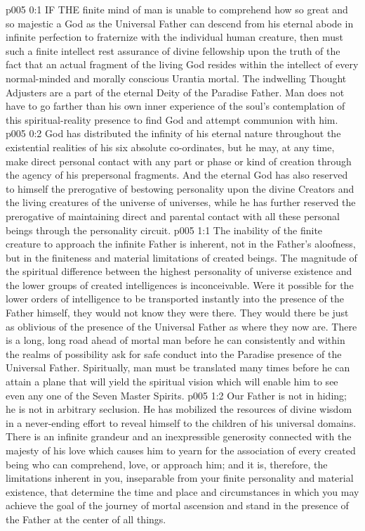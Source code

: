 \vs p005 0:1 IF THE finite mind of man is unable to comprehend how so great and so majestic a God as the Universal Father can descend from his eternal abode in infinite perfection to fraternize with the individual human creature, then must such a finite intellect rest assurance of divine fellowship upon the truth of the fact that an actual fragment of the living God resides within the intellect of every normal\hyp{}minded and morally conscious Urantia mortal. The indwelling Thought Adjusters are a part of the eternal Deity of the Paradise Father. Man does not have to go farther than his own inner experience of the soul’s contemplation of this spiritual\hyp{}reality presence to find God and attempt communion with him.
\vs p005 0:2 God has distributed the infinity of his eternal nature throughout the existential realities of his six absolute co\hyp{}ordinates, but he may, at any time, make direct personal contact with any part or phase or kind of creation through the agency of his prepersonal fragments. And the eternal God has also reserved to himself the prerogative of bestowing personality upon the divine Creators and the living creatures of the universe of universes, while he has further reserved the prerogative of maintaining direct and parental contact with all these personal beings through the personality circuit.
\vs p005 1:1 The inability of the finite creature to approach the infinite Father is inherent, not in the Father’s aloofness, but in the finiteness and material limitations of created beings. The magnitude of the spiritual difference between the highest personality of universe existence and the lower groups of created intelligences is inconceivable. Were it possible for the lower orders of intelligence to be transported instantly into the presence of the Father himself, they would not know they were there. They would there be just as oblivious of the presence of the Universal Father as where they now are. There is a long, long road ahead of mortal man before he can consistently and within the realms of possibility ask for safe conduct into the Paradise presence of the Universal Father. Spiritually, man must be translated many times before he can attain a plane that will yield the spiritual vision which will enable him to see even any one of the Seven Master Spirits.
\vs p005 1:2 Our Father is not in hiding; he is not in arbitrary seclusion. He has mobilized the resources of divine wisdom in a never\hyp{}ending effort to reveal himself to the children of his universal domains. There is an infinite grandeur and an inexpressible generosity connected with the majesty of his love which causes him to yearn for the association of every created being who can comprehend, love, or approach him; and it is, therefore, the limitations inherent in you, inseparable from your finite personality and material existence, that determine the time and place and circumstances in which you may achieve the goal of the journey of mortal ascension and stand in the presence of the Father at the center of all things.
